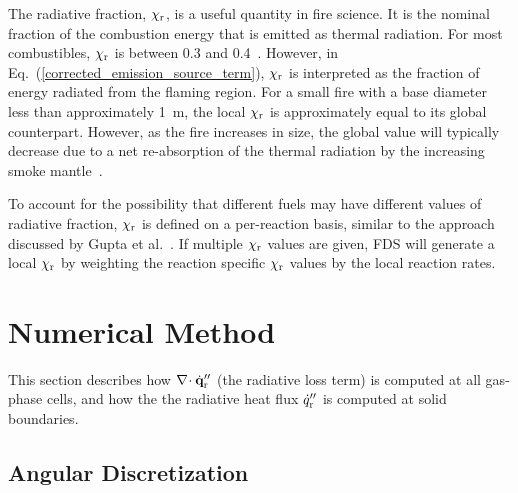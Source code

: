 The radiative fraction, $\chi_{\rm r}$, is a useful quantity in fire science. It is the nominal fraction of the combustion energy that is emitted as thermal radiation. For most combustibles, $\chi_{\rm r}$ is between 0.3 and 0.4~\cite{Beyler2:SFPE}. However, in Eq.~(\ref{corrected_emission_source_term}), $\chi_{\rm r}$ is interpreted as the fraction of energy radiated from the flaming region.  For a small fire with a base diameter less than approximately 1~m, the local $\chi_{\rm r}$ is approximately equal to its global counterpart. However, as the fire increases in size, the global value will typically decrease due to a net re-absorption of the thermal radiation by the increasing smoke mantle~\cite{Takahashi:1}.

To account for the possibility that different fuels may have different values of radiative fraction, $\chi_{\rm r}$ is defined on a per-reaction basis, similar to the approach discussed by Gupta et al.~\cite{Gupta:2015}. If multiple $\chi_{\rm r}$ values are given, FDS will generate a local $\chi_{\rm r}$ by weighting the reaction specific $\chi_{\rm r}$ values by the local reaction rates.


\section{Numerical Method}
\label{radnumericalmethodsection}

This section describes how $\nabla\!\cdot \dot{\mathbf{q}}_{\rm r}''$ (the radiative loss
term) is computed at all gas-phase cells, and how the
the radiative heat flux $\dot{q}_{\rm r}''$ is computed at solid boundaries.

\subsection{Angular Discretization}
\label{radiation-discre}

